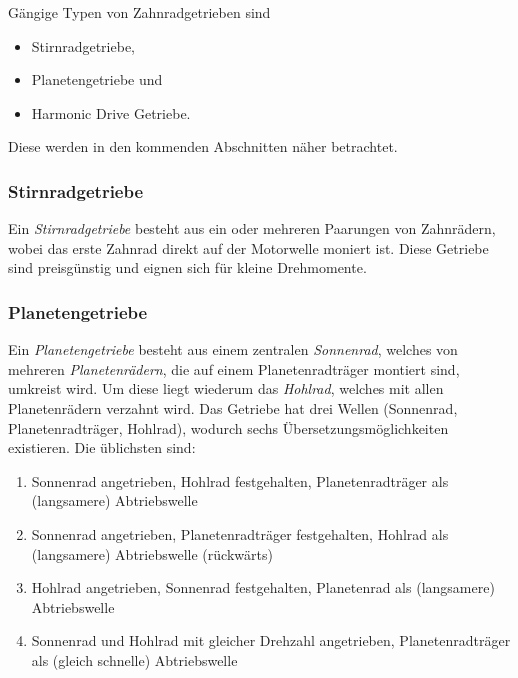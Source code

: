 \documentclass[a4paper, 11pt, accentcolor = tud3b]{tudreport}
\begin{document}
				Gängige Typen von Zahnradgetrieben sind
				\begin{itemize}
					\item Stirnradgetriebe,
					\item Planetengetriebe und
					\item Harmonic Drive Getriebe.
				\end{itemize}
				Diese werden in den kommenden Abschnitten näher betrachtet.

				\subsubsection{Stirnradgetriebe}
					Ein \emph{Stirnradgetriebe} besteht aus ein oder mehreren Paarungen von Zahnrädern, wobei das erste Zahnrad direkt auf der Motorwelle moniert ist. Diese Getriebe sind preisgünstig und eignen sich für kleine Drehmomente.

				\subsubsection{Planetengetriebe}
					Ein \emph{Planetengetriebe} besteht aus einem zentralen \emph{Sonnenrad}, welches von mehreren \emph{Planetenrädern}, die auf einem Planetenradträger montiert sind, umkreist wird. Um diese liegt wiederum das \emph{Hohlrad}, welches mit allen Planetenrädern verzahnt wird. Das Getriebe hat drei Wellen (Sonnenrad, Planetenradträger, Hohlrad), wodurch sechs Übersetzungsmöglichkeiten existieren. Die üblichsten sind:
					\begin{enumerate}
						\item Sonnenrad angetrieben, Hohlrad festgehalten, Planetenradträger als (langsamere) Abtriebswelle
						\item Sonnenrad angetrieben, Planetenradträger festgehalten, Hohlrad als (langsamere) Abtriebswelle (rückwärts)
						\item Hohlrad angetrieben, Sonnenrad festgehalten, Planetenrad als (langsamere) Abtriebswelle
						\item Sonnenrad und Hohlrad mit gleicher Drehzahl angetrieben, Planetenradträger als (gleich schnelle) Abtriebswelle
					\end{enumerate}
					
\end{document}
